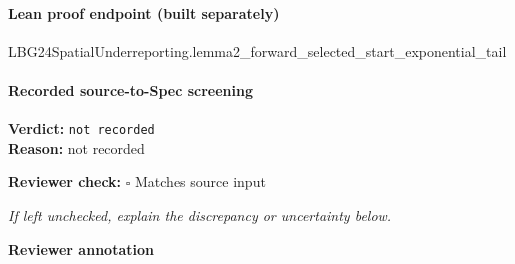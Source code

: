 \documentclass[10pt]{article}
\newcommand{\reviewerbox}{%
  \par\noindent\fbox{\parbox{0.96\linewidth}{\rule{0pt}{0.38in}}}\par
}
\newcommand{\reviewmatch}[1]{%
  \par\noindent\textbf{Reviewer check:} $\square$\; #1\par
  \noindent\emph{If left unchecked, explain the discrepancy or uncertainty below.}\par
}
\begin{document}
\paragraph{Lean proof endpoint (built separately)}\begin{ReviewVerbatim}
LBG24SpatialUnderreporting.lemma2_forward_selected_start_exponential_tail
\end{ReviewVerbatim}

\paragraph{Recorded source-to-Spec screening}
\textbf{Verdict:} \texttt{not recorded}
\\
\textbf{Reason:} not recorded
\reviewmatch{Matches source input}
\noindent\textbf{Reviewer annotation}\par
\reviewerbox
\end{document}
